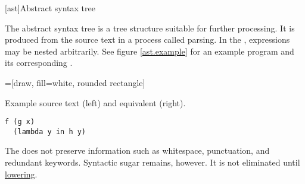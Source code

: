 [ast]{Abstract syntax tree}

The abstract syntax tree
is a tree structure
suitable for
further processing.
It is produced
from the source text
in a process called parsing.
In the ,
expressions may be nested
arbitrarily.
See figure \ref{ast.example}
for an example program
and its corresponding .

=[draw, fill=white, rounded rectangle]

\begin{zfigure}[sidebyside]{
    Example source text (left)
    and equivalent  (right).
}
    \label{ast.example}

    \begin{lstlisting}[language=Bottomcap]
f (g x)
  (lambda y in h y)
    \end{lstlisting}

    \tcblower

    \begin{center}
    \end{center}
\end{zfigure}

The 
does not preserve information such as
whitespace,
punctuation,
and redundant keywords.
Syntactic sugar
remains, however.
It is not eliminated
until \hyperref[anf.lower]{lowering}.
